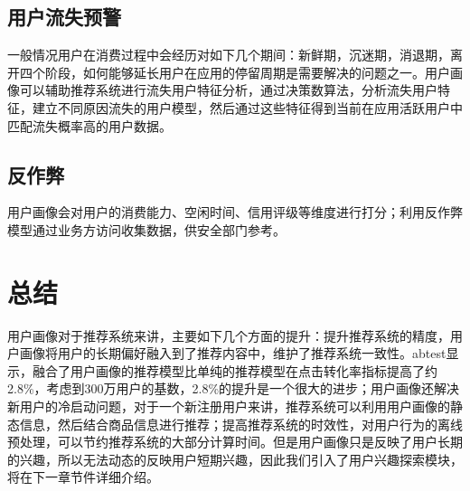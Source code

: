       \subsection{用户流失预警}
      一般情况用户在消费过程中会经历对如下几个期间：新鲜期，沉迷期，消退期，离开四个阶段，如何能够延长用户在应用的停留周期是需要解决的问题之一。用户画像可以辅助推荐系统进行流失用户特征分析，通过决策数算法，分析流失用户特征，建立不同原因流失的用户模型，然后通过这些特征得到当前在应用活跃用户中匹配流失概率高的用户数据。
      \subsection{反作弊}
      用户画像会对用户的消费能力、空闲时间、信用评级等维度进行打分；利用反作弊模型通过业务方访问收集数据，供安全部门参考。
    \section{总结}
      用户画像对于推荐系统来讲，主要如下几个方面的提升：提升推荐系统的精度，用户画像将用户的长期偏好融入到了推荐内容中，维护了推荐系统一致性。abtest显示，融合了用户画像的推荐模型比单纯的推荐模型在点击转化率指标提高了约2.8\%，考虑到300万用户的基数，2.8\%的提升是一个很大的进步；用户画像还解决新用户的冷启动问题，对于一个新注册用户来讲，推荐系统可以利用用户画像的静态信息，然后结合商品信息进行推荐；提高推荐系统的时效性，对用户行为的离线预处理，可以节约推荐系统的大部分计算时间。但是用户画像只是反映了用户长期的兴趣，所以无法动态的反映用户短期兴趣，因此我们引入了用户兴趣探索模块，将在下一章节件详细介绍。
